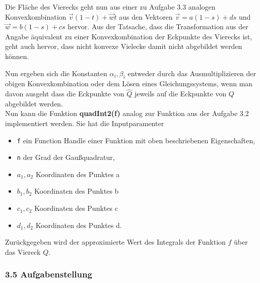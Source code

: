 \documentclass[a4paper,11pt,bibliography=totoc,listof=totoc,headinclude=true,cleardoublepage=empty,oneside]{scrbook}
\newcommand{\code}[1]{\texttt{\color{change}#1}}
\begin{document}
\hspace*{3.5cm}

Die Fläche des Vierecks geht nun aus einer zu Aufgabe 3.3 analogen Konvexkombination $\vec{v}(1-t)+\vec{w}t$ aus den Vektoren $\vec{v} = a(1-s)+ds$ und $\vec{w} = b(1-s)+cs$ hervor. Aus der Tatsache, dass die Transformation aus der Angabe äquivalent zu einer Konvexkombination der Eckpunkte des Vierecks ist, geht auch hervor, dass nicht konvexe Vielecke damit nicht abgebildet werden können.


Nun ergeben sich die Konstanten $\alpha_i, \beta_i$ entweder durch das Ausmultiplizieren der obigen Konvexkombination oder dem Lösen eines Gleichungssystems, wenn man davon ausgeht dass die Eckpunkte von $\hat{Q}$ jeweils auf die Eckpunkte von $Q$ abgebildet werden. \\



Nun kann die Funktion \textbf{quadInt2(f)} analog zur Funktion  aus der Aufgabe 3.2 implementiert werden. Sie hat die Inputparamenter
\begin{itemize}
	\item \code{f} ein Function Handle einer Funktion mit oben beschriebenen Eigenschaften,
	\item \code{n} der Grad der Gaußquadratur,
	\item \code{$a_1,a_2$} Koordinaten des Punktes a
	\item \code{$b_1,b_2$} Koordinaten des Punktes b
	\item \code{$c_1,c_2$} Koordinaten des Punktes c
	\item \code{$d_1,d_2$} Koordinaten des Punktes d.
\end{itemize} 

\noindent Zurückgegeben wird der approximierte Wert des Integrals der Funktion $f$ über das Viereck $Q$.

{\color{change}
\lstset{ 
	language=Matlab, 
	showstringspaces=false}
}

\subsubsection{3.5 Aufgabenstellung}
\end{document}

